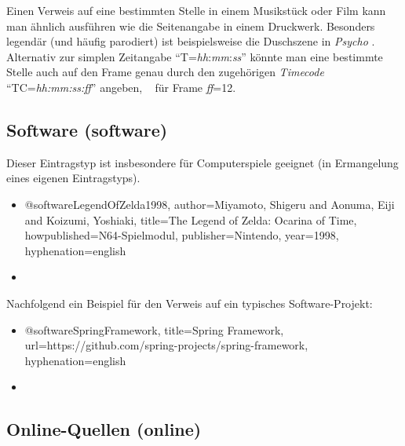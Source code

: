 Einen Verweis auf eine bestimmten Stelle in einem Musikstück oder Film kann man 
ähnlich ausführen wie die Seitenangabe in einem Druckwerk.
Besonders legendär (und häufig parodiert) ist beispielsweise die Duschszene
in \emph{Psycho} \cite[T=00:32:10]{Psycho1960}.
Alternativ zur simplen Zeitangabe "`T=\emph{hh}:\emph{mm}:\emph{ss}"' 
könnte man eine bestimmte Stelle auch auf den Frame genau durch 
den zugehörigen \emph{Timecode} "`TC=\emph{hh:mm:ss:ff}"' angeben, 
\zB\ \cite[TC=00:32:10:12]{Psycho1960} für Frame \emph{ff}=12.



\subsection{Software (\textsf{software})}
\label{sec:@software}



Dieser Eintragstyp ist insbesondere für Computerspiele geeignet (in Ermangelung
eines eigenen Eintragstyps).
%
\begin{itemize}
\item[] 
\begin{GenericCode}[numbers=none]
@software{LegendOfZelda1998,
  author={Miyamoto, Shigeru and Aonuma, Eiji and Koizumi, Yoshiaki},
  title={The Legend of Zelda: Ocarina of Time},
  howpublished={N64-Spielmodul},
  publisher={Nintendo},
  year={1998},
  hyphenation={english}
}
\end{GenericCode}
\item[\cite{LegendOfZelda1998}] 
\end{itemize}

\noindent
Nachfolgend ein Beispiel für den Verweis auf ein typisches Software-Projekt:
%
\begin{itemize}
\item[] 
\begin{GenericCode}[numbers=none]
@software{SpringFramework,
	title={Spring Framework},
	url={https://github.com/spring-projects/spring-framework},
	hyphenation={english}
}
\end{GenericCode}
\item[\cite{SpringFramework}] 
\end{itemize}



\subsection{Online-Quellen (\textsf{online})}
\label{sec:KategorieOnline}

